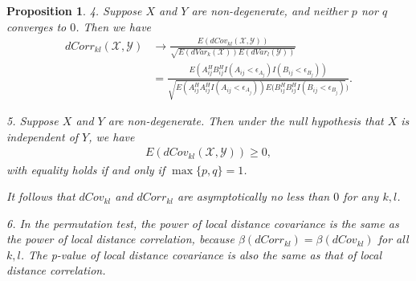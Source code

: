 \documentclass[12pt]{article}
\newtheorem{prop}{Proposition}
\begin{document}
\begin{prop}
4. Suppose $X$ and $Y$ are non-degenerate, and neither $p$ nor $q$ converges to $0$. Then we have
\begin{align*}
dCorr_{kl}(\mathcal{X},\mathcal{Y}) & \rightarrow \frac{E(dCov_{kl}(\mathcal{X},\mathcal{Y}))}{\sqrt{E(dVar_{k}(\mathcal{X}))E(dVar_{l}(\mathcal{Y}))}}\\
&=\frac{E(A^{H}_{ij}B^{H}_{ij}I(A_{ij}< \epsilon_{A_{j}})I(B_{ij}< \epsilon_{B_{j}}))}{\sqrt{E(A^{H}_{ij}A^{H}_{ij}I(A_{ij}< \epsilon_{A_{j}}))E(B^{H}_{ij}B^{H}_{ij}I(B_{ij}< \epsilon_{B_{j}})})}. 
\end{align*}

5. Suppose $X$ and $Y$ are non-degenerate. Then under the null hypothesis that $X$ is independent of $Y$, we have
\begin{align*}
E(dCov_{kl}(\mathcal{X},\mathcal{Y})) \geq 0,
\end{align*}
with equality holds if and only if $\max\{p,q\} = 1$. 

It follows that $dCov_{kl}$ and $dCorr_{kl}$ are asymptotically no less than $0$ for any $k,l$.

6. In the permutation test, the power of local distance covariance is the same as the power of local distance correlation, because $\beta(dCorr_{kl})=\beta(dCov_{kl})$ for all $k,l$. The p-value of local distance covariance is also the same as that of local distance correlation.
\end{prop}
\end{document}
